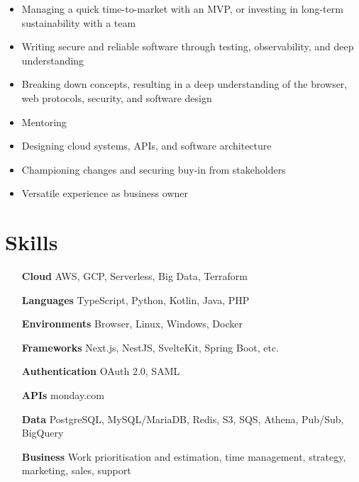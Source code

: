 \documentclass[a4paper,10pt]{article}
\begin{document}
            \begin{itemize}[itemsep=-2px, parsep=1pt, leftmargin=10pt]
              \item Managing a quick time-to-market with an MVP, or investing in long-term sustainability with a team
              \item Writing secure and reliable software through testing, observability, and deep understanding
              \item Breaking down concepts, resulting in a deep understanding of the browser, web protocols, security, and software design
              \item Mentoring
              \item Designing cloud systems, APIs, and software architecture
              \item Championing changes and securing buy-in from stakeholders
              \item Versatile experience as business owner
            \end{itemize}



          \section{Skills}

          \begin{multicols}{2}
            \begin{itemize}[itemsep=-2px, parsep=1pt, leftmargin=75pt]
                \item[\textbf{Cloud}] AWS, GCP, Serverless, Big Data, Terraform
                \item[\textbf{Languages}] TypeScript, Python, Kotlin, Java, PHP
                \item[\textbf{Environments}] Browser, Linux, Windows, Docker
                \item[\textbf{Frameworks}] Next.js, NestJS, SvelteKit, Spring Boot, etc.
                \item[\textbf{Authentication}] OAuth 2.0, SAML
                \item[\textbf{APIs}] monday.com
                \item[\textbf{Data}] PostgreSQL, MySQL/MariaDB, Redis, S3, SQS, Athena, Pub/Sub, BigQuery
                \item[\textbf{Business}] Work prioritisation and estimation, time management, strategy, marketing, sales, support
            \end{itemize}
          \end{multicols}
\end{document}
